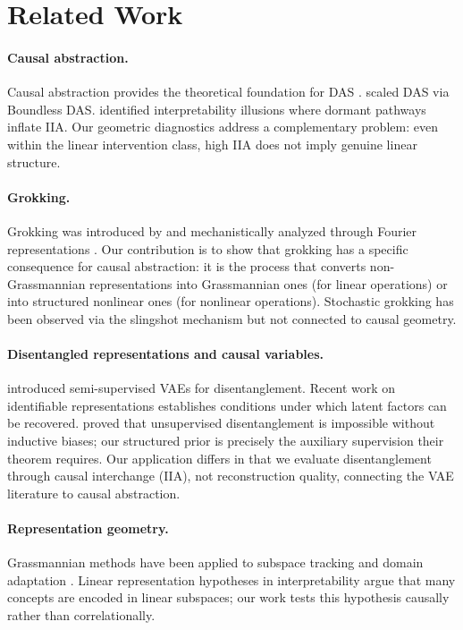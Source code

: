 \documentclass{article}
\begin{document}
\section{Related Work}
\label{sec:related}

\paragraph{Causal abstraction.}
Causal abstraction provides the theoretical foundation for DAS
\citep{geiger2021causal, geiger2023finding}. \citet{wu2024interpretability}
scaled DAS via Boundless DAS. \citet{makelov2024illusion} identified
interpretability illusions where dormant pathways inflate IIA. Our geometric
diagnostics address a complementary problem: even within the linear intervention
class, high IIA does not imply genuine linear structure.

\paragraph{Grokking.}
Grokking was introduced by \citet{power2022grokking} and mechanistically
analyzed through Fourier representations \citep{nanda2023progress,
zhong2024clock}. Our contribution is to show that grokking has a specific
consequence for causal abstraction: it is the process that converts
non-Grassmannian representations into Grassmannian ones (for linear operations)
or into structured nonlinear ones (for nonlinear operations). Stochastic grokking
has been observed via the slingshot mechanism \citep{thilak2022slingshot} but not
connected to causal geometry.

\paragraph{Disentangled representations and causal variables.}
\citet{narayanaswamy2017learning} introduced semi-supervised VAEs for
disentanglement. Recent work on identifiable representations
\citep{khemakhem2020variational} establishes conditions under which latent
factors can be recovered. \citet{locatello2019challenging} proved that
unsupervised disentanglement is impossible without inductive biases; our
structured prior is precisely the auxiliary supervision their theorem
requires. Our application differs in that we evaluate
disentanglement through causal interchange (IIA), not reconstruction quality,
connecting the VAE literature to causal abstraction.

\paragraph{Representation geometry.}
Grassmannian methods have been applied to subspace tracking and domain adaptation
\citep{edelman1998geometry, gopalan2011domain}. Linear representation hypotheses
in interpretability \citep{marks2023geometry, engels2024language,
park2024linear} argue that many concepts are encoded in linear subspaces; our
work tests this hypothesis causally rather than correlationally.
\end{document}
